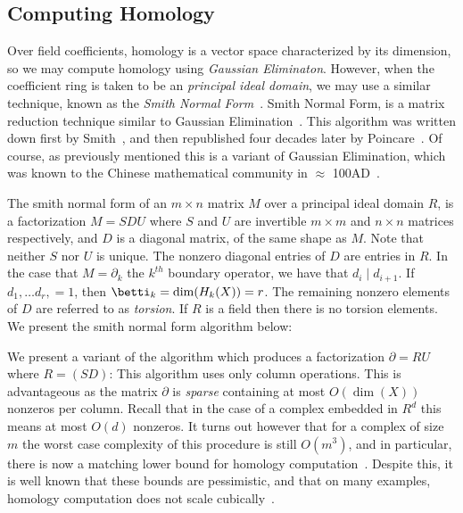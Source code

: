 \subsection{Computing Homology}
Over field coefficients, homology is a vector space characterized by its dimension, so we may compute homology using \emph{Gaussian Eliminaton}. However, when the coefficient ring is taken to be an \emph{principal ideal domain}, we may use a similar technique, known as the \emph{Smith Normal Form}~\cite{uhlig}. Smith Normal Form, is a matrix reduction technique similar to Gaussian Elimination~\cite{uhlig}. This algorithm was written down first by Smith~\cite{smith}, and then republished four decades later by Poincare~\cite{poincare-smith}. Of course, as previously mentioned this is a variant of Gaussian Elimination, which was known to the Chinese mathematical community in $\approx$ 100AD~\cite{chinese-ge}.

The smith normal form of an $m \times n$ matrix $M$ over a principal ideal domain $R$, is a factorization $M = SDU$ where $S$ and $U$ are invertible $m \times m$ and $n \times n$ matrices respectively, and $D$ is a diagonal matrix, of the same shape as $M$. Note that neither $S$ nor $U$ is unique. The nonzero diagonal entries of $D$ are entries in $R$. In the case that $M = \partial_k$ the $k^{th}$  boundary operator, we have that $d_i \mid d_{i+1}$. If $d_1, \ldots d_r, = 1$, then $\betti_k = \dim(H_k(X)) = r$. The remaining nonzero elements of $D$ are referred to as \emph{torsion}. If $R$ is a field then there is no torsion elements. We present the smith normal form algorithm below:

We  present a variant of the algorithm which produces a factorization $\partial = RU$ where $R = (SD)$: 
This algorithm uses only column operations. This is advantageous as the matrix $\partial$ is \emph{sparse} containing at most $O(\operatorname{dim}{(X)})$ nonzeros per column. Recall that in the case of a complex embedded in $R^d$ this means at most $O(d)$ nonzeros. It turns out however that for a complex of size $m$ the worst case complexity of this procedure is still $O(m^3)$, and in particular, there is now a matching lower bound for homology computation~\cite{parsa}. Despite this, it is well known that these bounds are pessimistic, and that on many examples, homology computation does not scale cubically~\cite{stuff}.

